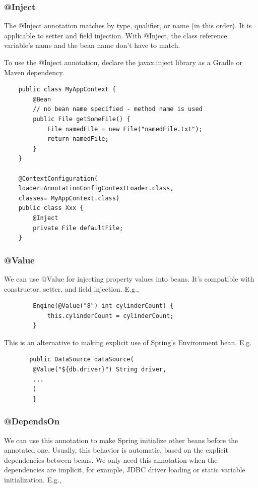 \documentclass{scrartcl}
\begin{document}
\subsubsection{@Inject}

The @Inject annotation matches by type, qualifier, or name (in this order). It is applicable to setter and field injection. With @Inject, the class reference variable's name and the bean name don’t have to match.

To use the @Inject annotation, declare the javax.inject library as a Gradle or Maven dependency.

\begin{lstlisting}
    public class MyAppContext {
        @Bean
        // no bean name specified - method name is used
        public File getSomeFile() {
            File namedFile = new File("namedFile.txt");
            return namedFile;
        }
    }

    @ContextConfiguration(
    loader=AnnotationConfigContextLoader.class,
    classes= MyAppContext.class)
    public class Xxx {
        @Inject
        private File defaultFile;
    }
\end{lstlisting}

\subsubsection{@Value}

    We can use @Value for injecting property values into beans. It’s compatible with constructor, setter, and field injection. E.g.,

    \begin{lstlisting}
        Engine(@Value("8") int cylinderCount) {
            this.cylinderCount = cylinderCount;
        }
    \end{lstlisting}

    This is an alternative to making explicit use of Spring's Environment bean. E.g.

    \begin{lstlisting}
       public DataSource dataSource(
        @Value("${db.driver}") String driver,
        ...
        )
        }
    \end{lstlisting}

\subsubsection{@DependsOn}

    We can use this annotation to make Spring initialize other beans before the annotated one. Usually, this behavior is automatic, based on the explicit dependencies between beans. We only need this annotation when the dependencies are implicit, for example, JDBC driver loading or static variable initialization. E.g.,
\end{document}
